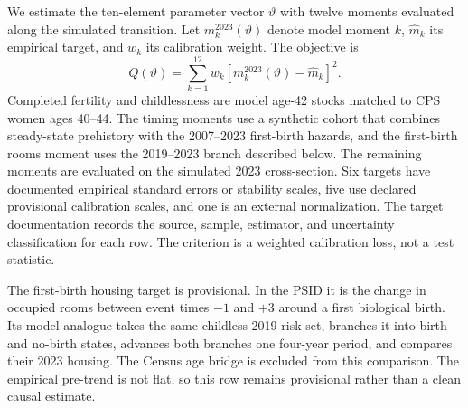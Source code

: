 \documentclass[11pt]{article}
\theoremstyle{definition}
\newcommand{\1}{\mathbf 1}
\begin{document}
We estimate the ten-element parameter vector \(\vartheta\) with twelve moments
evaluated along the simulated transition. Let \(m_k^{2023}(\vartheta)\) denote
model moment \(k\), \(\widehat m_k\) its empirical target, and \(w_k\) its
calibration weight. The objective is
\begin{equation}
 Q(\vartheta)=\sum_{k=1}^{12}w_k
 \left[m_k^{2023}(\vartheta)-\widehat m_k\right]^2.
 \label{eq:transition_objective}
\end{equation}
Completed fertility and childlessness are model age-42 stocks matched to CPS
women ages 40--44. The
timing moments use a synthetic cohort that combines steady-state prehistory
with the 2007--2023 first-birth hazards, and the first-birth rooms moment uses
the 2019--2023 branch described below. The remaining moments are evaluated on
the simulated 2023 cross-section. Six targets have documented empirical
standard errors or stability scales, five use declared provisional calibration
scales, and one is an external normalization. The target documentation records
the source, sample, estimator, and uncertainty classification for each row. The
criterion is a weighted calibration loss, not a test statistic.

The first-birth housing target is provisional. In the
PSID it is the change in occupied rooms between event times \(-1\) and \(+3\)
around a first biological birth. Its model analogue takes the same childless
2019 risk set, branches it into birth and no-birth states, advances both
branches one four-year period, and compares their 2023 housing. The Census age
bridge is excluded from this comparison. The empirical pre-trend is not flat,
so this row remains provisional rather than a clean causal estimate.
\end{document}
